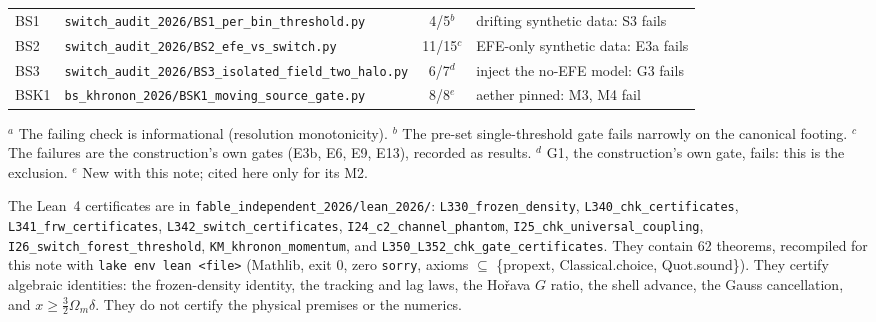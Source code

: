\documentclass[10pt]{article}
\newcommand{\fpath}[1]{\nolinkurl{#1}}
\begin{document}
{\begin{longtable}{@{}l>{\raggedright\arraybackslash}p{}c>{\raggedright\arraybackslash}p{}@{}}
BS1 & \fpath{switch_audit_2026/BS1_per_bin_threshold.py} & 4/5$^b$ & drifting synthetic data: S3 fails \\
BS2 & \fpath{switch_audit_2026/BS2_efe_vs_switch.py} & 11/15$^c$ & EFE-only synthetic data: E3a fails \\
BS3 & \fpath{switch_audit_2026/BS3_isolated_field_two_halo.py} & 6/7$^d$ & inject the no-EFE model: G3 fails \\
BSK1 & \fpath{bs_khronon_2026/BSK1_moving_source_gate.py} & 8/8$^e$ & aether pinned: M3, M4 fail \\
\bottomrule
\end{longtable}
\vspace{-8pt}

$^a$ The failing check is informational (resolution monotonicity). $^b$ The pre-set single-threshold gate fails narrowly on the canonical footing. $^c$ The failures are the construction's own gates (E3b, E6, E9, E13), recorded as results. $^d$ G1, the construction's own gate, fails: this is the exclusion. $^e$ New with this note; cited here only for its M2.
}

\smallskip
The Lean~4 certificates are in \fpath{fable_independent_2026/lean_2026/}: \fpath{L330_frozen_density}, \fpath{L340_chk_certificates}, \fpath{L341_frw_certificates}, \fpath{L342_switch_certificates}, \fpath{I24_c2_channel_phantom}, \fpath{I25_chk_universal_coupling}, \fpath{I26_switch_forest_threshold}, \fpath{KM_khronon_momentum}, and \fpath{L350_L352_chk_gate_certificates}. They contain 62 theorems, recompiled for this note with \texttt{lake env lean <file>} (Mathlib, exit 0, zero \texttt{sorry}, axioms $\subseteq$ \{propext, Classical.choice, Quot.sound\}).
They certify algebraic identities: the frozen-density identity, the tracking and lag laws, the Ho\v{r}ava $G$ ratio, the shell advance, the Gauss cancellation, and $x\geq\tfrac32\Omega_m\delta$. They do not certify the physical premises or the numerics.
\end{document}
